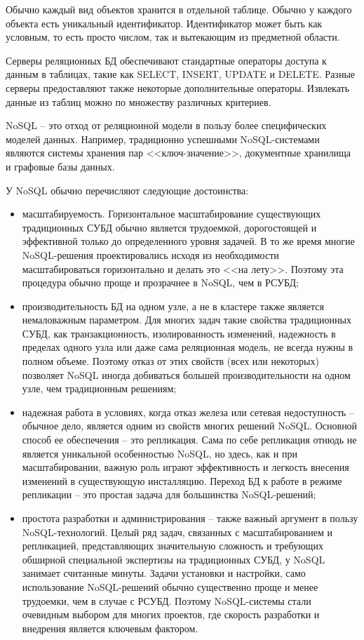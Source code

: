 Обычно каждый вид объектов хранится в отдельной таблице. Обычно у каждого объекта есть уникальный идентификатор. Идентификатор может быть как условным, то есть просто числом, так и вытекающим из предметной области.

Серверы реляционных БД обеспечивают стандартные операторы доступа к данным в таблицах, такие как SELECT, INSERT, UPDATE и DELETE. Разные серверы предоставляют также некоторые дополнительные операторы. Извлекать данные из таблиц можно по множеству различных критериев.

NoSQL -- это отход от реляционной модели в пользу более специфических моделей данных. Например, традиционно успешными NoSQL-системами являются системы хранения пар <<ключ-значение>>, документные хранилища и графовые базы данных.

У NoSQL обычно перечисляют следующие достоинства:
\begin{itemize}
  \item масштабируемость. Горизонтальное масштабирование существующих традиционных СУБД обычно является трудоемкой, дорогостоящей и эффективной только до определенного уровня задачей. В то же время многие NoSQL-решения проектировались исходя из необходимости масштабироваться горизонтально и делать это <<на лету>>. Поэтому эта процедура обычно проще и прозрачнее в NoSQL, чем в РСУБД;
  \item производительность БД на одном узле, а не в кластере также является немаловажным параметром. Для многих задач такие свойства традиционных СУБД, как транзакционность, изолированность изменений, надежность в пределах одного узла или даже сама реляционная модель, не всегда нужны в полном объеме. Поэтому отказ от этих свойств (всех или некоторых) позволяет NoSQL иногда добиваться большей производительности на одном узле, чем традиционным решениям;
  \item надежная работа в условиях, когда отказ железа или сетевая недоступность -- обычное дело, является одним из свойств многих решений NoSQL. Основной способ ее обеспечения -- это репликация. Сама по себе репликация отнюдь не является уникальной особенностью NoSQL, но здесь, как и при масштабировании, важную роль играют эффективность и легкость внесения изменений в существующую инсталляцию. Переход БД к работе в режиме репликации -- это простая задача для большинства NoSQL-решений;
  \item простота разработки и администрирования -- также важный аргумент в пользу NoSQL-технологий. Целый ряд задач, связанных с масштабированием и репликацией, представляющих значительную сложность и требующих обширной специальной экспертизы на традиционных СУБД, у NoSQL занимает считанные минуты. Задачи установки и настройки, само использование NoSQL-решений обычно существенно проще и менее трудоемки, чем в случае с РСУБД. Поэтому NoSQL-системы стали очевидным выбором для многих проектов, где скорость разработки и внедрения является ключевым фактором.
\end{itemize}

